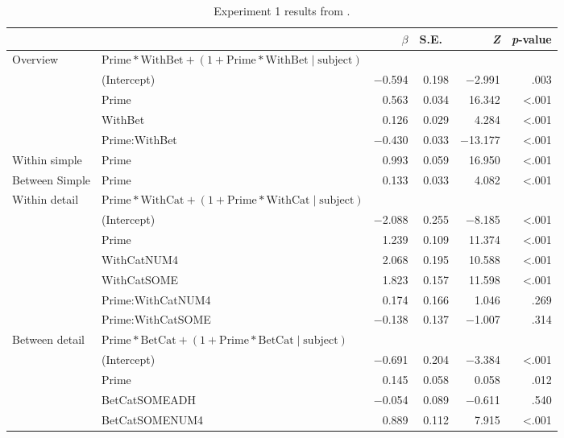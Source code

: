 \documentclass[10pt]{article}
\begin{document}
\begin{multicols}{2}
\begin{table}[ht]
  \caption{Experiment 1 results from \textcite[125]{Bott:2016aa}.}\vspace{-20pt}
  \label{tab:oriresults}
  \begin{center}
    \begin{tabular}{llrrrr}
      \hline
      & & \(\beta\) & S.E.\ & \emph{Z} & \emph{p}-value  \\
      \hline
      Overview & \(\text{Prime} * \text{WithBet} + (1 + \text{Prime} * \text{WithBet} \mid \text{subject})\) & & & \\
      & (Intercept) & \(-\)0.594 & 0.198 & \(-\)2.991 & .003 \\
      & Prime & 0.563 & 0.034 & 16.342 & <.001 \\
      & WithBet & 0.126 & 0.029 & 4.284 & <.001 \\
      & Prime:WithBet & \(-\)0.430 & 0.033 & \(-\)13.177 & <.001 \\
      Within simple & Prime & 0.993 & 0.059 & 16.950 & <.001 \\
      Between Simple & Prime & 0.133 & 0.033 & 4.082 & <.001 \\
      Within detail & \multicolumn{2}{l}{\(\text{Prime} * \text{WithCat} + (1 + \text{Prime} * \text{WithCat} \mid \text{subject})\)}  & & & \\
      & (Intercept)  & \(-\)2.088 & 0.255 & \(-\)8.185 & <.001\\
      & Prime & 1.239 & 0.109 & 11.374 & <.001 \\
      & WithCatNUM4 & 2.068 & 0.195 & 10.588 & <.001 \\
      & WithCatSOME & 1.823 & 0.157 & 11.598 & <.001 \\
      & Prime:WithCatNUM4 & 0.174 & 0.166 & 1.046 & .269 \\
      & Prime:WithCatSOME & \(-\)0.138 & 0.137 & \(-\)1.007 & .314 \\
      Between detail & \multicolumn{2}{l}{\(\text{Prime} * \text{BetCat} + (1 + \text{Prime} * \text{BetCat} \mid \text{subject})\)}  & & & \\
      & (Intercept)  & \(-\)0.691 & 0.204 & \(-\)3.384 & <.001\\
      & Prime & 0.145 & 0.058 & 0.058 & .012 \\
      & BetCatSOMEADH & \(-\)0.054 & 0.089 & \(-\)0.611 & .540 \\
      & BetCatSOMENUM4 & 0.889 & 0.112 & 7.915 & <.001 \\

\end{tabular}
\end{center}
\end{table}
\end{multicols}
\end{document}
